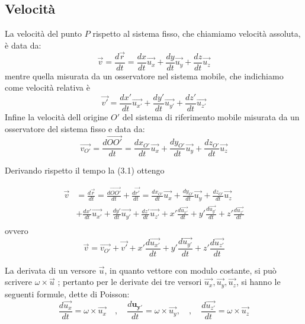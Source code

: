 \documentclass[class=book, crop=false, oneside, 12pt]{standalone}
\begin{document}
\subsection{Velocità}

La velocità del punto \(P\) rispetto al sistema fisso, che chiamiamo velocità assoluta, è data da:
\begin{equation}
    \overrightarrow{v} = \frac{d \overrightarrow{r}}{dt} = \frac{dx}{dt} \overrightarrow{u_x} + \frac{dy}{dt} \overrightarrow{u_y} + \frac{dz}{dt} \overrightarrow{u_z}
\end{equation}
mentre quella misurata da un osservatore nel sistema mobile, che indichiamo come velocità relativa è
\begin{equation}
    \overrightarrow{v'} = \frac{dx'}{dt} \overrightarrow{u_{x'}} +\frac{dy'}{dt} \overrightarrow{u_{y'}} + \frac{dz'}{dt} \overrightarrow{u_{z'}}
\end{equation}
Infine la velocità dell origine \(O'\) del sistema di riferimento mobile misurata da un osservatore del sistema fisso e data da:
\begin{equation}
    \overrightarrow{v_{O'}}=\frac{d \overrightarrow{OO'}}{d t}=\frac{d x_{O'}}{d t} \overrightarrow{u_{x}}+\frac{d y_{O'}}{d t} \overrightarrow{u_{y}}+\frac{d z_{O'}}{d t} \overrightarrow{u_{z}}
\end{equation}

Derivando rispetto il tempo la (3.1) ottengo

\begin{align*}
    \overrightarrow{v}&=\frac{d \overrightarrow{r}}{dt} = \frac{d \overrightarrow{OO'}}{d t} + \frac{d \overrightarrow{r'}}{dt} = \frac{d x_{O'}}{d t} \overrightarrow{u_{x}}+\frac{d y_{O'}}{d t} \overrightarrow{u_{y}}+\frac{d z_{O'}}{d t} \overrightarrow{u_{z}}\\
    &+\frac{dx'}{dt} \overrightarrow{u_{x'}} + \frac{dy'}{dt} \overrightarrow{u_{y'}} + \frac{dz'}{dt} \overrightarrow{u_{z'}} + x' \frac{d\overrightarrow{u_{x'}}}{dt}  + y' \frac{d\overrightarrow{u_{y'}}}{dt}  + z' \frac{d\overrightarrow{u_{z'}}}{dt}\\
\end{align*}
ovvero
\begin{equation}
    \overrightarrow{v} = \overrightarrow{v_{O'}} + \overrightarrow{v'} + x' \frac{d\overrightarrow{u_{x'}}}{dt}  + y' \frac{d\overrightarrow{u_{y'}}}{dt}  + z' \frac{d\overrightarrow{u_{z'}}}{dt}
\end{equation}

La derivata di un versore \(\overrightarrow{u}\), in quanto vettore con modulo costante, si può scrivere \(\omega \times \overrightarrow{u}\) ; pertanto per le derivate dei tre versori \(\overrightarrow{u_x},\overrightarrow{u_y},\overrightarrow{u_z}\), si hanno le seguenti formule, dette di Poisson:
\begin{equation}
    \frac{d \overrightarrow{u_{x}}}{d t}=\omega \times \overrightarrow{u_{x}} \quad, \quad \frac{d \mathbf{u_{y'}}}{d t}=\omega \times \overrightarrow{u_{y}}, \quad, \quad \frac{d \overrightarrow{u_{z'}}}{d t}=\omega \times \overrightarrow{u_{z}}
\end{equation} 
\end{document}
